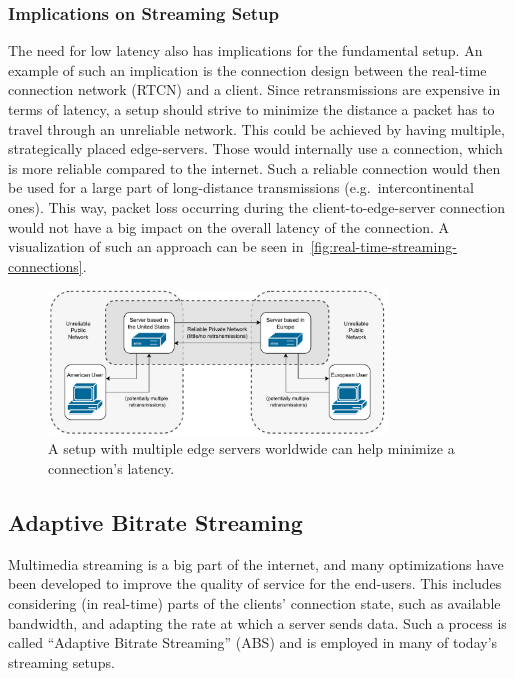 \subsubsection{Implications on Streaming Setup}
The need for low latency also has implications for the fundamental setup.
An example of such an implication is the connection design between the 
real-time connection network (RTCN) and a client.
Since retransmissions are expensive in terms of latency, a setup should strive to minimize 
the distance a packet has to travel through an unreliable network.
This could be achieved by having multiple, strategically placed edge-servers.
Those would internally use a connection, which is more reliable compared to the internet.
Such a reliable connection would then be used for a large part of long-distance transmissions
(e.g.~intercontinental ones).
This way, packet loss occurring during the client-to-edge-server connection would not have a big 
impact on the overall latency of the connection.
A visualization of such an approach can be seen in~\autoref{fig:real-time-streaming-connections}.

\vspace{0.5cm}
\begin{figure}[H]
    \centering
    \includegraphics[width=0.8\textwidth]{figures/02_background/real-time-streaming-connections.drawio.pdf}
    \caption[Real-time streaming connections]{A setup with multiple edge servers worldwide can help minimize a connection's latency.}\label{fig:real-time-streaming-connections}
\end{figure}

\subsection{Adaptive Bitrate Streaming}\label{subsec:adaptive_bitrate_streaming}
Multimedia streaming is a big part of the internet, and many optimizations have
been developed to improve the quality of service for the end-users.
This includes considering (in real-time) parts of the clients' connection state, 
such as available bandwidth, and adapting the rate at which a server sends data.
Such a process is called ``Adaptive Bitrate Streaming'' (ABS) and is employed in many 
of today's streaming setups.

